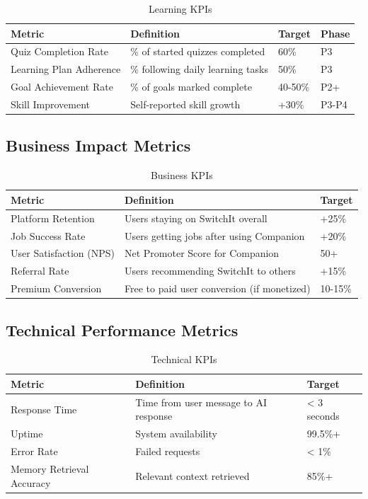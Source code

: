 \documentclass[12pt,a4paper]{article}
\begin{document}
\begin{table}[h]
\centering
\begin{tabularx}{\textwidth}{|l|X|l|l|}
\hline
\textbf{Metric} & \textbf{Definition} & \textbf{Target} & \textbf{Phase} \\
\hline
Quiz Completion Rate & \% of started quizzes completed & 60\% & P3 \\
\hline
Learning Plan Adherence & \% following daily learning tasks & 50\% & P3 \\
\hline
Goal Achievement Rate & \% of goals marked complete & 40-50\% & P2+ \\
\hline
Skill Improvement & Self-reported skill growth & +30\% & P3-P4 \\
\hline
\end{tabularx}
\caption{Learning KPIs}
\end{table}

\subsection{Business Impact Metrics}

\begin{table}[h]
\centering
\begin{tabularx}{\textwidth}{|l|X|l|}
\hline
\textbf{Metric} & \textbf{Definition} & \textbf{Target} \\
\hline
Platform Retention & Users staying on SwitchIt overall & +25\% \\
\hline
Job Success Rate & Users getting jobs after using Companion & +20\% \\
\hline
User Satisfaction (NPS) & Net Promoter Score for Companion & 50+ \\
\hline
Referral Rate & Users recommending SwitchIt to others & +15\% \\
\hline
Premium Conversion & Free to paid user conversion (if monetized) & 10-15\% \\
\hline
\end{tabularx}
\caption{Business KPIs}
\end{table}

\subsection{Technical Performance Metrics}

\begin{table}[h]
\centering
\begin{tabularx}{\textwidth}{|l|X|l|}
\hline
\textbf{Metric} & \textbf{Definition} & \textbf{Target} \\
\hline
Response Time & Time from user message to AI response & < 3 seconds \\
\hline
Uptime & System availability & 99.5\%+ \\
\hline
Error Rate & Failed requests & < 1\% \\
\hline
Memory Retrieval Accuracy & Relevant context retrieved & 85\%+ \\
\hline
\end{tabularx}
\caption{Technical KPIs}
\end{table}
\end{document}

